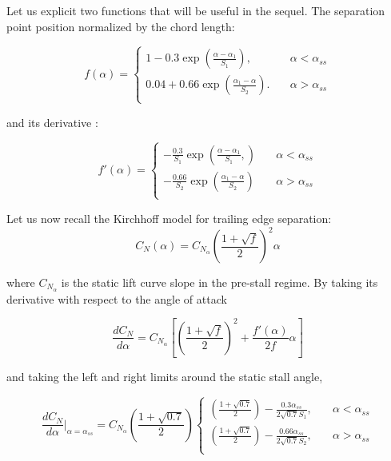 \documentclass{article}
\begin{document}
Let us explicit two functions that will be useful in the sequel. The separation point position normalized by the chord length:

\begin{equation}
f(\alpha) = 
     \begin{cases}
       1-0.3\exp(\frac{\alpha-\alpha_1}{S_1}), &\quad \alpha < \alpha_{ss}\\
        0.04+0.66\exp(\frac{\alpha_1-\alpha}{S_2}). &\quad \alpha > \alpha_{ss}\\
     \end{cases}
\end{equation}

\noindent and its derivative :

\begin{equation} 
f'(\alpha) = 
     \begin{cases}
       -\frac{0.3}{S_1}\exp(\frac{\alpha-\alpha_1}{S_1},) &\quad \alpha < \alpha_{ss}\\
        -\frac{0.66}{S_2}\exp(\frac{\alpha_1-\alpha}{S_2}) &\quad \alpha > \alpha_{ss}\\
     \end{cases}
\end{equation}

Let us now recall the Kirchhoff model for trailing edge separation:
\begin{equation}
C_N (\alpha) = C_ {N_{\alpha}} \left(\frac{1+\sqrt{f}}{2}\right)^2 \alpha
\end{equation}

\noindent where $C_{N_\alpha}$ is the static lift curve slope in the pre-stall regime. By taking its derivative with respect to the angle of attack

\begin{equation}
\frac{dC_N}{d\alpha} = C_{N_{\alpha}} \left[\left(\frac{1+\sqrt{f}}{2}\right)^2+\frac{f'(\alpha)}{2f}\alpha \right]
\end{equation}

\noindent and taking the left and right limits around the static stall angle,

\begin{equation}
\frac{dC_N}{d\alpha}|_{\alpha=\alpha_{ss}} = C_{N_\alpha}\left(\frac{1+\sqrt{0.7}}{2}\right)
     \begin{cases}
      \left(\frac{1+\sqrt{0.7}}{2}\right)-\frac{0.3\alpha_{ss}}{2\sqrt{0.7}S_1},&\quad \alpha < \alpha_{ss}\\
        \left(\frac{1+\sqrt{0.7}}{2}\right)-\frac{0.66\alpha_{ss}}{2\sqrt{0.7}S_2}, &\quad \alpha > \alpha_{ss}\\
     \end{cases}
\end{equation}
\end{document}
